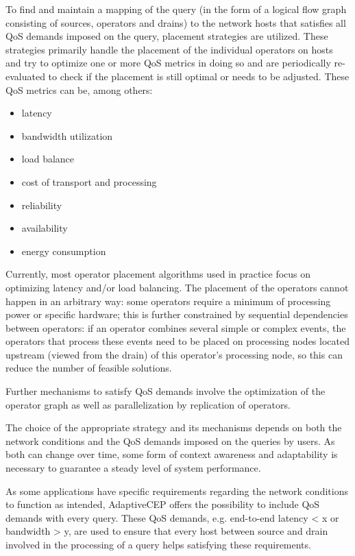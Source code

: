 To find and maintain a mapping of the query (in the form of a logical flow graph consisting of sources, operators and drains) to the network hosts that satisfies all QoS demands imposed on the query, placement strategies are utilized. 
These strategies primarily handle the placement of the individual operators on hosts and try to optimize one or more QoS metrics in doing so and are periodically re-evaluated to check if the placement is still optimal or needs to be adjusted. 
These QoS metrics can be, among others: 
\begin{itemize}
\item latency 
\item bandwidth utilization
\item load balance
\item cost of transport and processing
\item reliability
\item availability
\item energy consumption
\end{itemize}

Currently, most operator placement algorithms used in practice focus on optimizing latency and/or load balancing. 
The placement of the operators cannot happen in an arbitrary way: some operators require a minimum of processing power or specific hardware; this is further constrained by sequential dependencies between operators: if an operator combines several simple or complex events, the operators that process these events need to be placed on processing nodes located upstream (viewed from the drain) of this operator's processing node, so this can reduce the number of feasible solutions. 

Further mechanisms to satisfy QoS demands involve the optimization of the operator graph as well as parallelization by replication of operators.

The choice of the appropriate strategy and its mechanisms depends on both the network conditions and the QoS demands imposed on the queries by users. As both can change over time, some form of context awareness and adaptability is necessary to guarantee a steady level of system performance.


As some applications have specific requirements regarding the network conditions to function as intended, AdaptiveCEP offers the possibility to include QoS demands with every query. These QoS demands, e.g. end-to-end latency < x or bandwidth > y, are used to ensure that every host between source and drain involved in the processing of a query helps satisfying these requirements. 

